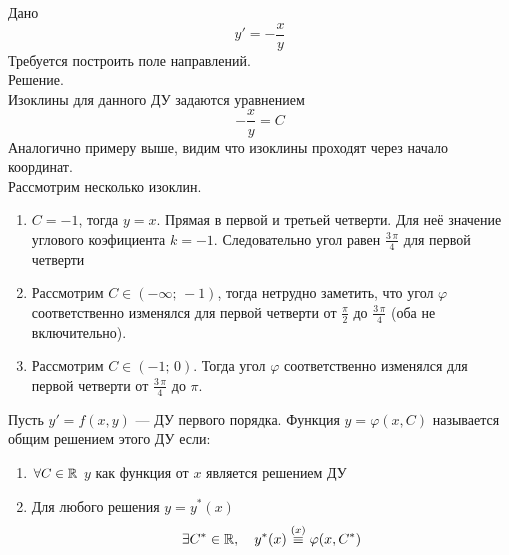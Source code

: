 \begin{Example}
    Дано
    \[
        y' = -\frac{x}{y}
    \]
    Требуется построить поле направлений.\\
    Решение.\\
    Изоклины для данного ДУ задаются уравнением 
    \[
        -\frac{x}{y} = C
    \]
    Аналогично примеру выше, видим что изоклины проходят через начало координат.\\
    Рассмотрим несколько изоклин.
    \begin{enumerate}
        \item $C = -1$, тогда $y = x$. Прямая в первой и третьей четверти. Для неё значение углового коэфициента $k = -1$. Следовательно угол равен $\frac{3\,\pi}{4}$ для первой четверти
        
        \item Рассмотрим $C \in (-\infty;\, -1)$, тогда нетрудно заметить, что угол $\varphi$ соответственно изменялся для первой четверти от $\frac{\pi}{2}$ до $\frac{3\,\pi}{4}$ (оба не включительно).
        
        \item Рассмотрим $C \in (-1;\, 0)$. Тогда угол $\varphi$ соответственно изменялся для первой четверти от $\frac{3\,\pi}{4}$ до $\pi$.
    \end{enumerate}
    \begin{figure}[h!]
        \noindent{}
    \end{figure}
\end{Example}

\begin{Def}
    Пусть $y' = f(x, y)$ --- ДУ первого порядка. Функция $y = \varphi(x, C)$ называется общим решением этого ДУ если:
    \begin{enumerate}
        \item $\forall C \in \mathbb{R}$ $y$ как функция от $x$ является решением ДУ
        
        \item Для любого решения $y = y^*(x)$ 
        \[
            \exists C^* \in \mathbb{R}, \quad y^*(x) \stackrel{(x)}{\equiv} \varphi(x, C^*)
        \]
    \end{enumerate}
\end{Def}

